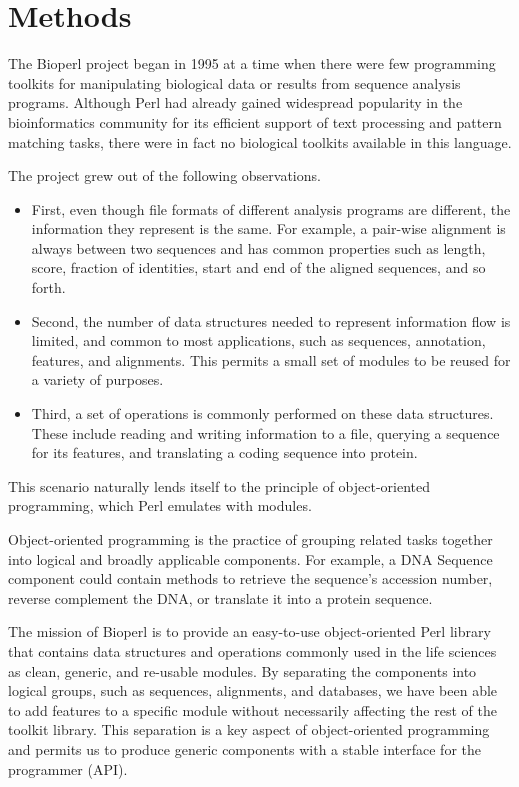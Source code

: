 \documentclass[12pt]{article}
\begin{document}
\section{Methods}

The Bioperl project began in 1995 \cite{chervitz-bits} at a time when
there were few programming toolkits for manipulating biological data
or results from sequence analysis programs.  Although Perl had already
gained widespread popularity in the bioinformatics community for its
efficient support of text processing and pattern matching tasks, there
were in fact no biological toolkits available in this language.

The project grew out of the following observations.  
\begin{itemize}

\item First, even though file formats of different analysis programs
are different, the information they represent is the same.  For
example, a pair-wise alignment is always between two sequences and has
common properties such as length, score, fraction of identities, start
and end of the aligned sequences, and so forth.

\item Second, the number of data structures needed to represent
information flow is limited, and common to most applications, such as
sequences, annotation, features, and alignments.  This permits a 
small set of modules to be reused for a variety of purposes.

\item Third, a set of operations is commonly performed on these data
structures.  These include reading and writing information to a file,
querying a sequence for its features, and translating a coding
sequence into protein.

\end{itemize}

This scenario naturally lends itself to the principle of
object-oriented programming, which Perl emulates with modules.

Object-oriented programming is the practice of grouping related tasks
together into logical and broadly applicable components.  For example,
a DNA Sequence component could contain methods to retrieve the
sequence's accession number, reverse complement the DNA, or translate
it into a protein sequence.

The mission of Bioperl is to provide an easy-to-use object-oriented
Perl library that contains data structures and operations commonly
used in the life sciences as clean, generic, and re-usable modules.
By separating the components into logical groups, such as sequences,
alignments, and databases, we have been able to add features to a
specific module without necessarily affecting the rest of the toolkit
library.  This separation is a key aspect of object-oriented
programming and permits us to produce generic components with a stable
interface for the programmer (API).  
\end{document}
